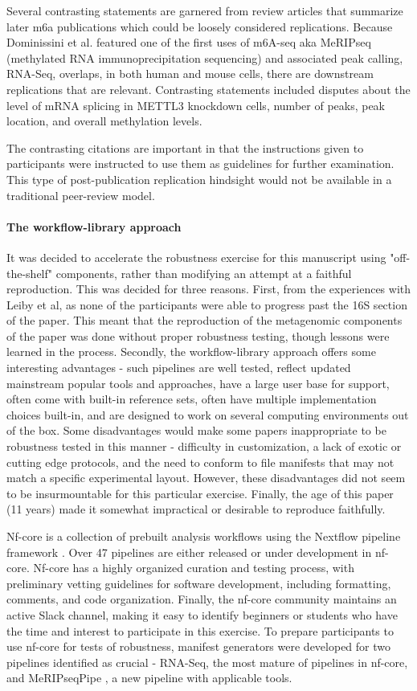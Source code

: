 \documentclass{drexelthesis}
\begin{document}
Several contrasting statements are garnered from review articles that summarize later m6a publications which could be loosely considered replications. Because Dominissini et al. featured one of the first uses of m6A-seq aka MeRIPseq (methylated RNA immunoprecipitation sequencing) and associated peak calling, RNA-Seq, overlaps, in both human and mouse cells, there are downstream replications that are relevant. Contrasting statements included disputes about the level of mRNA splicing in METTL3 knockdown cells, number of peaks, peak location, and overall methylation levels.

The contrasting citations are important in that the instructions given to participants were instructed to use them as guidelines for further examination. This type of post-publication replication hindsight would not be available in a traditional peer-review model.

\paragraph{The workflow-library approach}

It was decided to accelerate the robustness exercise for this manuscript using "off-the-shelf" components, rather than modifying an attempt at a faithful reproduction. This was decided for three reasons. First, from the experiences with Leiby et al, as none of the participants were able to progress past the 16S section of the paper. This meant that the reproduction of the metagenomic components of the paper was done without proper robustness testing, though lessons were learned in the process. Secondly, the workflow-library approach offers some interesting advantages - such pipelines are well tested, reflect updated mainstream popular tools and approaches, have a large user base for support, often come with built-in reference sets, often have multiple implementation choices built-in, and are designed to work on several computing environments out of the box. Some disadvantages would make some papers inappropriate to be robustness tested in this manner - difficulty in customization, a lack of exotic or cutting edge protocols, and the need to conform to file manifests that may not match a specific experimental layout. However, these disadvantages did not seem to be insurmountable for this particular exercise. Finally, the age of this paper (11 years) made it somewhat impractical or desirable to reproduce faithfully.

Nf-core is a collection of prebuilt analysis workflows using the Nextflow pipeline framework \cite{Ewels2020-rf}. Over 47 pipelines are either released or under development in nf-core. Nf-core has a highly organized curation and testing process, with preliminary vetting guidelines for software development, including formatting, comments, and code organization. Finally, the nf-core community maintains an active Slack channel, making it easy to identify beginners or students who have the time and interest to participate in this exercise. To prepare participants to use nf-core for tests of robustness, manifest generators were developed for two pipelines identified as crucial - RNA-Seq, the most mature of pipelines in nf-core, and MeRIPseqPipe \cite{Bao2022-nk}, a new pipeline with applicable tools.
\end{document}
